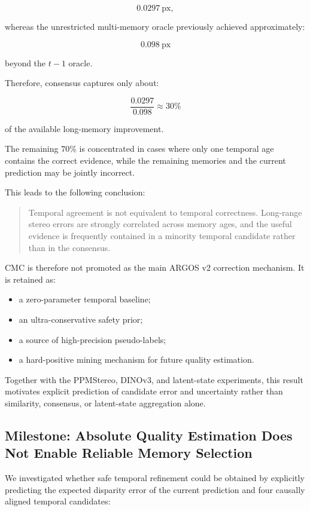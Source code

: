 \documentclass[11pt,a4paper]{article}
\begin{document}
\[
0.0297 \ \mathrm{px},
\]

whereas the unrestricted multi-memory oracle previously achieved approximately:

\[
0.098 \ \mathrm{px}
\]

beyond the \(t-1\) oracle.

Therefore, consensus captures only about:

\[
\frac{0.0297}{0.098}
\approx 30\%
\]

of the available long-memory improvement.

The remaining \(70\%\) is concentrated in cases where only one temporal age contains the correct evidence, while the remaining memories and the current prediction may be jointly incorrect.

This leads to the following conclusion:

\begin{quote}
Temporal agreement is not equivalent to temporal correctness. Long-range stereo errors are strongly correlated across memory ages, and the useful evidence is frequently contained in a minority temporal candidate rather than in the consensus.
\end{quote}

CMC is therefore not promoted as the main ARGOS v2 correction mechanism. It is retained as:

\begin{itemize}
    \item a zero-parameter temporal baseline;
    \item an ultra-conservative safety prior;
    \item a source of high-precision pseudo-labels;
    \item a hard-positive mining mechanism for future quality estimation.
\end{itemize}

Together with the PPMStereo, DINOv3, and latent-state experiments, this result motivates explicit prediction of candidate error and uncertainty rather than similarity, consensus, or latent-state aggregation alone.

\subsection{Milestone: Absolute Quality Estimation Does Not Enable Reliable Memory Selection}

We investigated whether safe temporal refinement could be obtained by explicitly predicting the expected disparity error of the current prediction and four causally aligned temporal candidates:
\end{document}

